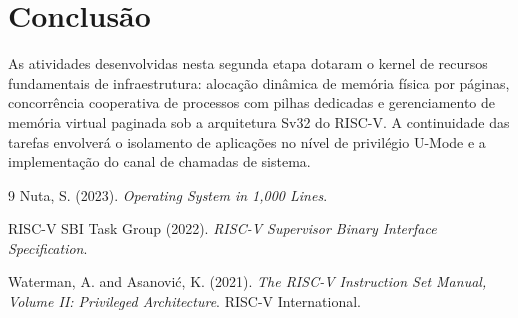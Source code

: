 \documentclass[12pt]{article}
\begin{document}
\section{Conclusão}

As atividades desenvolvidas nesta segunda etapa dotaram o kernel de recursos fundamentais de infraestrutura: alocação dinâmica de memória física por páginas, concorrência cooperativa de processos com pilhas dedicadas e gerenciamento de memória virtual paginada sob a arquitetura Sv32 do RISC-V. A continuidade das tarefas envolverá o isolamento de aplicações no nível de privilégio U-Mode e a implementação do canal de chamadas de sistema.

\begin{thebibliography}{9}
Nuta, S. (2023). \textit{Operating System in 1,000 Lines}.

RISC-V SBI Task Group (2022). \textit{RISC-V Supervisor Binary Interface Specification}.

Waterman, A. and Asanovi\'{c}, K. (2021). \textit{The RISC-V Instruction Set Manual, Volume II: Privileged Architecture}. RISC-V International.
\end{thebibliography}
\end{document}
